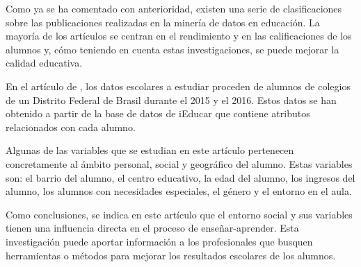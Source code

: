 Como ya se ha comentado con anterioridad, existen una serie de clasificaciones sobre las publicaciones realizadas en la minería de datos en educación. La mayoría de los artículos se centran en el rendimiento y en las calificaciones de los alumnos y, cómo teniendo en cuenta estas investigaciones, se puede mejorar la calidad educativa.

En el artículo de , los datos escolares a estudiar proceden de alumnos de colegios de un Distrito Federal de Brasil durante el 2015 y el 2016. Estos datos se han obtenido a partir de la base de datos de iEducar que contiene atributos relacionados con cada alumno. 

Algunas de las variables que se estudian en este artículo pertenecen concretamente al ámbito personal, social y geográfico del alumno. Estas variables son: el barrio del alumno, el centro educativo, la edad del alumno, los ingresos del alumno, los alumnos con necesidades especiales, el género y el entorno en el aula.

Como conclusiones, se indica en este artículo que el entorno social y sus variables tienen una influencia directa en el proceso de enseñar-aprender. Esta investigación puede aportar información a los profesionales que busquen herramientas o métodos para mejorar los resultados escolares de los alumnos.

